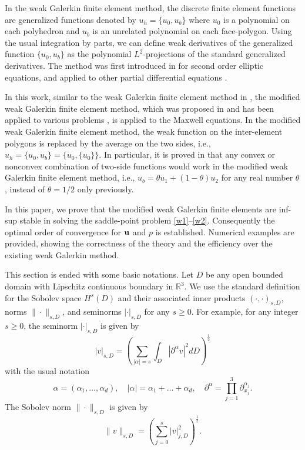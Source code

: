 \documentclass[11pt]{amsart}
\renewcommand{\ldots}{\dotsc}
\begin{document}
In the weak Galerkin finite element method, the discrete finite element 
  functions are generalized functions denoted by 
$u_h=\{u_0, u_b\}$ where $u_0$ is a polynomial
  on each polyhedron and $u_b$ is an unrelated polynomial on each face-polygon.
Using the usual integration by parts, we can define weak derivatives of the  generalized
  function $\{u_0, u_b\}$ as the polynomial $L^2$-projections of the standard generalized 
   derivatives. 
The method was first introduced in
\cite{wy, wy-mixed} for second order elliptic equations, and 
applied to other partial differential equations 
\cite{cwang-jwang-biharmonic,sf-wg,cdg1,cdg2,cdg3,Ye-Zhang2020b,
   Ye-Zhang2020c,sf-hdiv,Ye-Zhang2021,Ye-Zhang2021S,Ye-Zhang2022,Ye-Zhang2022b,Ye-Zhang2023}.

In this work, similar to the weak Galerkin finite element method in \cite{Mu-W-Y-Z},
  the modified weak Galerkin finite element method,  which was proposed in \cite{XWang} and has been applied to various problems 
   \cite{Cui-Y-Z,Gao-Z-Z,Mu-XW-Y,XiuliWang},  is applied to the Maxwell equations.
In the modified weak Galerkin finite element method, the weak function
  on the inter-element polygons is replaced by the average on the two sides, i.e.,
    $u_h=\{u_0, u_b\}=\{u_0,\{u_0\}\}$.
  In particular, it is proved in \cite{Gao-Y-Z} that any convex or nonconvex combination
  of two-side functions would work in the modified weak Galerkin finite element
  method, i.e., $u_b=\theta u_1+(1-\theta) u_2$ for any real number $\theta$, instead of
   $\theta=1/2$ only previously.


In this paper, we prove that the modified weak Galerkin finite elements are
   inf-sup stable in solving the saddle-point problem \eqref{w1}--\eqref{w2}.
Consequently the optimal order of convergence for $\mathbf{u}$ and $p$ is established.
Numerical examples are provided, showing the correctness of the theory and
  the efficiency over the existing weak Galerkin method.
 

This section is ended with some basic notations.
Let $D$ be any open bounded domain with Lipschitz continuous
boundary in $\mathbb{R}^3$. We use the standard definition for the
Sobolev space $H^s(D)$ and their associated inner products
$(\cdot,\cdot)_{s,D}$, norms $\|\cdot\|_{s,D}$, and seminorms
$|\cdot|_{s,D}$ for any $s\ge 0$. For example, for any integer $s\ge
0$, the seminorm $|\cdot|_{s, D}$ is given by
$$
|v|_{s, D} = \left( \sum_{|\alpha|=s} \int_D |\partial^\alpha v|^2
dD \right)^{\frac12}
$$
with the usual notation
$$
\alpha=(\alpha_1, \ldots, \alpha_d), \quad |\alpha| =
\alpha_1+\ldots+\alpha_d,\quad
\partial^\alpha =\prod_{j=1}^3\partial_{x_j}^{\alpha_j}.
$$
The Sobolev norm $\|\cdot\|_{s,D}$ is given by
$$
\|v\|_{s, D} = \left(\sum_{j=0}^s |v|^2_{j,D} \right)^{\frac12}.
$$
\end{document}
